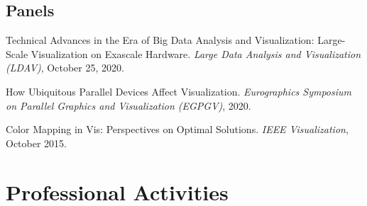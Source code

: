 \documentclass{article}
\begin{document}
\subsection*{Panels}

\begin{enumerate}[label={[\arabic*]}]
\item Technical Advances in the Era of Big Data Analysis and Visualization: Large-Scale Visualization on Exascale Hardware.
  \emph{Large Data Analysis and Visualization (LDAV)}, October 25, 2020.
\item How Ubiquitous Parallel Devices Affect Visualization.
  \emph{Eurographics Symposium on Parallel Graphics and Visualization (EGPGV)}, 2020.
\item Color Mapping in Vis: Perspectives on Optimal Solutions.
  \emph{IEEE Visualization}, October 2015.
\end{enumerate}


\section*{Professional Activities}
\end{document}
